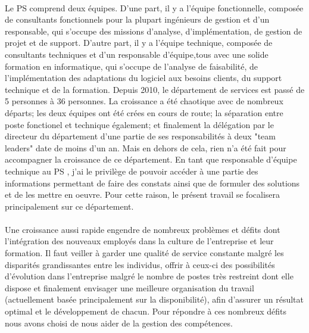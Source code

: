 \paragraph{}Le PS comprend deux équipes. D'une part, il y a l'équipe fonctionnelle, composée de consultants fonctionnels pour la plupart ingénieurs de gestion et d'un responsable, qui s'occupe des missions d'analyse, d'implémentation, de gestion de projet et de support. D'autre part, il y a l'équipe technique, composée de consultants techniques et d'un responsable d'équipe,tous avec une solide formation en informatique, qui s'occupe de l'analyse de faisabilité, de l'implémentation des adaptations du logiciel aux besoins clients, du support technique et de la formation. Depuis 2010, le département de services est passé de 5 personnes à 36 personnes. La croissance a été chaotique avec de nombreux départs; les deux équipes ont été crées en cours de route; la séparation entre poste fonctionel et technique également; et finalement la délégation par le directeur du département d'une partie de ses responsabilités à deux "team leaders" date de moins d'un an. Mais en dehors de cela, rien n'a été fait pour accompagner la croissance de ce département. En tant que responsable d’équipe technique au PS , j’ai le privilège de pouvoir accéder à une partie des informations permettant de faire des constats ainsi que de formuler des solutions et de les mettre en oeuvre. Pour cette raison, le présent travail se focalisera principalement sur ce département.


\paragraph*{}Une croissance aussi rapide engendre de nombreux problèmes et défits dont l'intégration des nouveaux employés dans la culture de l'entreprise et leur formation. Il faut veiller à garder une qualité de service constante malgré les disparités grandissantes entre les individus, offrir à ceux-ci des possibilités d'évolution dans l'entreprise malgré le nombre de postes très restreint dont elle dispose et finalement envisager une meilleure organisation du travail (actuellement basée principalement sur la disponibilité), afin d'assurer un résultat optimal et le développement de chacun. Pour répondre à ces nombreux défits nous avons choisi de nous aider de la gestion des compétences.

